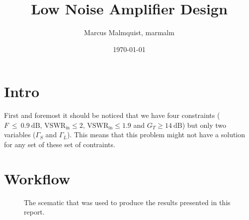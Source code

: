 \documentclass[12pt,a4paper]{article}
\title{Low Noise Amplifier Design}
\author{Marcus Malmquist, marmalm}
\date{\today}
\begin{document}
\maketitle

\section{Intro}
First and foremost it should be noticed that we have four constraints ($F~\leq~\SI{0.9}{\deci\bel}$, $\text{VSWR}_\text{in}\leq 2$, $\text{VSWR}_\text{in}\leq 1.9$ and $G_T\geq\SI{14}{\deci\bel}$) but only two variables ($\Gamma_S$ and $\Gamma_L$). This means that this problem might not have a solution for any set of these set of contraints.

\section{Workflow}\label{sec:wf}
\begin{figure}[h]
  \centering
  \noindent\makebox[\textwidth]{\scalebox{0.7}{}}
  \caption{The scematic that was used to produce the results presented in this report.}
  \label{fig:scematic}
\end{figure}
\end{document}
